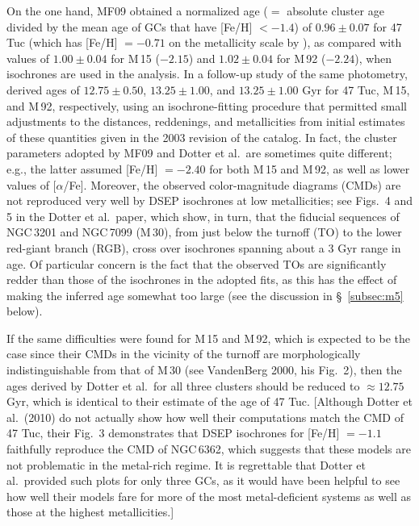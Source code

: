 \documentclass[12pt,preprint]{aastex}
\begin{document}
On the one hand, MF09 obtained a normalized age ($=$ absolute cluster age
divided by the mean age of GCs that have [Fe/H] $< -1.4$) of $0.96 \pm 0.07$
for 47 Tuc (which has [Fe/H] $= -0.71$ on the metallicity scale by
\citealt{zw84}), as compared with values of $1.00 \pm 0.04$ for M$\,$15
($-2.15$) and $1.02 \pm 0.04$ for M$\,$92 ($-2.24$), when \citet[hereafter
DSEP]{dcj07} isochrones are used in the analysis.  In a follow-up study of the
same photometry, \citet{dsa10} derived ages of $12.75 \pm 0.50$, $13.25 \pm
1.00$, and $13.25 \pm 1.00$ Gyr for 47 Tuc, M$\,$15, and M$\,$92, respectively,
using an isochrone-fitting procedure that permitted small adjustments to the
distances, reddenings, and metallicities from initial estimates of these
quantities given in the 2003 revision of the \citet{har96} catalog.  In fact,
the cluster parameters adopted by MF09 and Dotter et al.~are sometimes quite
different; e.g., the latter assumed [Fe/H] $= -2.40$ for both M$\,$15 and
M$\,$92, as well as lower values of [$\alpha$/Fe].  Moreover, the observed
color-magnitude diagrams (CMDs) are not reproduced very well by DSEP isochrones
at low metallicities; see Figs.~4 and 5 in the Dotter et al.~paper, which
show, in turn, that the fiducial sequences of NGC$\,$3201 and NGC$\,$7099
(M$\,$30), from just below the turnoff (TO) to the lower red-giant branch (RGB),
cross over isochrones spanning about a 3 Gyr range in age. Of particular concern
is the fact that the observed TOs are significantly redder than those of the 
isochrones in the adopted fits, as this has the effect of making the inferred
age somewhat too large (see the discussion in \S~\ref{subsec:m5} below).

If the same difficulties were found for M$\,$15 and M$\,$92, which is expected
to be the case since their CMDs in the vicinity of the turnoff are
morphologically indistinguishable from that of M$\,$30 (see VandenBerg 2000,
his Fig.~2), then the ages derived by Dotter et al.~for all three clusters
should be reduced to $\approx 12.75$ Gyr, which is identical to their estimate
of the age of 47 Tuc.  [Although Dotter et al.~(2010) do not actually show how
well their computations match the CMD of 47 Tuc, their Fig.~3 demonstrates that
DSEP isochrones for [Fe/H] $= -1.1$ faithfully reproduce the CMD of NGC$\,$6362,
which suggests that these models are not problematic in the metal-rich regime.
It is regrettable that Dotter et al.~provided such plots for only three GCs, as
it would have been helpful to see how well their models fare for more of the
most metal-deficient systems as well as those at the highest metallicities.]
\end{document}
